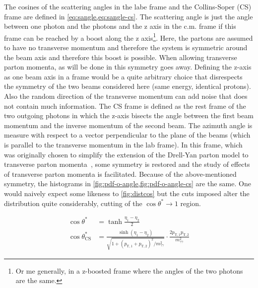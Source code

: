 The cosines of the scattering angles in the labe frame and the
Collins-Soper (CS) frame are defined in
\cref{eq:sangle,eq:sangle-cs}. The scattering angle is just the angle
between one photon and the photons and the z axis in the c.m. frame if
this frame can be reached by a boost along the z axis\footnote{Or me
  generally, in a z-boosted frame where the angles of the two photons
  are the same.}. Here, the partons are assumed to have no transverse
momentum and therefore the system is symmetric around the beam axis
and therefore this boost is possible. When allowing transverse parton
momenta, as will be done in %
this symmetry goes away. Defining the z-axis as one beam axis in a
frame would be a quite arbitrary choice that disrespects the symmetry
of the two beams considered here (same energy, identical protons).
Also the random direction of the transverse momentum can add noise
that does not contain much information. The CS frame is defined as the
rest frame of the two outgoing photons in which the z-axis bisects the
angle between the first beam momentum and the inverse momentum of the
second beam. The azimuth angle is measure with respect to a vector
perpendicular to the plane of the beams (which is parallel to the
transverse momentum in the lab frame). In this frame, which was
originally chosen to simplify the extension of the Drell-Yan parton
model to transverse parton momenta~\cite{collins:1977an}, some
symmetry is restored and the study of effects of transverse parton
momenta is facilitated. Because of the above-mentioned symmetry, the
histograms in \cref{fig:pdf-o-angle,fig:pdf-o-angle-cs} are the
same. One would naively expect some likeness to \cref{fig:distcos} but
the cuts imposed alter the distribution quite considerably, cutting of
the \(\cos\theta^\ast\rightarrow 1\)
region. %

\begin{align}
  \cos\theta^\ast &= \tanh\frac{\eta_1 - \eta_2}{2} \label{eq:sangle}\\
  \cos\theta^*_\text{CS} &= \frac{\sinh(\eta_1 -
                           \eta_2)}{\sqrt{1+(p_{\text{T},1} + p_{\text{T},2})^2/m_{\gamma\gamma}^2}}\cdot
                          \frac{2p_{\text{T},1}p_{\text{T},2}}{m_{\gamma\gamma}^2}\label{eq:sangle-cs}
\end{align}

